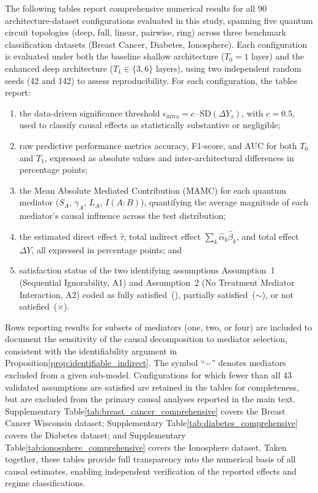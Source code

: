 \documentclass[
    reprint,
    amsmath, amssymb,
    aps,
    floatfix,
    nofootinbib
]{revtex4-1}
\begin{document}
The following tables report comprehensive numerical results for 
all 90 architecture-dataset configurations evaluated in this study,  spanning five quantum circuit topologies (deep, full, linear,  pairwise, ring) across three benchmark classification datasets (Breast Cancer, Diabetes, Ionosphere). Each configuration is evaluated under both the baseline shallow architecture ($T_0 = 1$ layer) and the enhanced deep architecture ($T_1 \in \{3, 6\}$ layers), using two independent random seeds (42 and 142) to assess reproducibility. For each configuration, the tables report: 
\begin{enumerate}
    \item[(i)] the data-driven significance threshold $\epsilon_{\mathrm{intra}} = c \cdot 
    \mathrm{SD}(\Delta Y_s)$, with $c = 0.5$, used to classify 
    causal effects as statistically substantive or negligible; 
    \item [(ii)]raw predictive performance metrics accuracy, F1-score, 
    and AUC  for both $T_0$ and $T_1$, expressed as absolute 
    values and inter-architectural differences in percentage points; 
    \item[(iii)] the Mean Absolute Mediated Contribution (MAMC) for each 
    quantum mediator ($S_A$, $\gamma_A$, $L_A$, $I(A{:}B)$), 
    quantifying the average magnitude of each mediator's causal 
    influence across the test distribution; 
    \item[(iv)] the estimated 
    direct effect $\hat{\tau}$, total indirect effect 
    $\sum_k \hat{\alpha}_k \hat{\beta}_k$, and total effect 
    $\Delta Y$, all expressed in percentage points; and 
    \item[(v)] satisfaction status of the two identifying assumptions  
    Assumption~1 (Sequential Ignorability, A1) and Assumption~2 
    (No Treatment Mediator Interaction, A2)  coded as fully 
    satisfied~(\checkmark), partially satisfied~($\sim$), or 
    not satisfied~($\times$).
\end{enumerate}
Rows reporting results for subsets of mediators (one, two, 
or four) are included to document the sensitivity of the 
causal decomposition to mediator selection, consistent with 
the identifiability argument in Proposition\ref{prop:identifiable_indirect}. The symbol 
``$-$'' denotes mediators excluded from a given sub-model. 
Configurations for which fewer than all 43 validated 
assumptions are satisfied are retained in the tables 
for completeness, but are excluded from the primary 
causal analyses reported in the main text.
Supplementary Table\ref{tab:breast_cancer_comprehensive} covers the Breast Cancer Wisconsin dataset; Supplementary Table\ref{tab:diabetes_comprehensive} covers the Diabetes dataset; and Supplementary Table\ref{tab:ionosphere_comprehensive} covers the Ionosphere dataset. Taken together, these tables provide full transparency into the numerical basis of all causal estimates, enabling independent verification of the reported effects and regime classifications.
\end{document}
